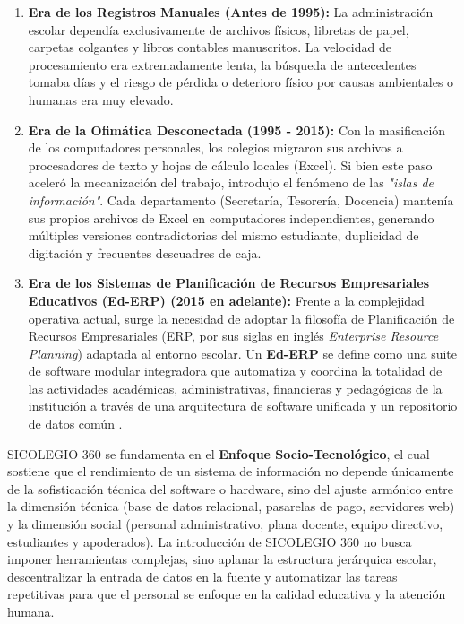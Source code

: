 \documentclass[12pt,a4paper,oneside]{report}
\begin{document}
    \begin{enumerate}
        \item \textbf{Era de los Registros Manuales (Antes de 1995):} La administración escolar dependía exclusivamente de archivos físicos, libretas de papel, carpetas colgantes y libros contables manuscritos. La velocidad de procesamiento era extremadamente lenta, la búsqueda de antecedentes tomaba días y el riesgo de pérdida o deterioro físico por causas ambientales o humanas era muy elevado.
        \item \textbf{Era de la Ofimática Desconectada (1995 - 2015):} Con la masificación de los computadores personales, los colegios migraron sus archivos a procesadores de texto y hojas de cálculo locales (Excel). Si bien este paso aceleró la mecanización del trabajo, introdujo el fenómeno de las \textit{"islas de información"}. Cada departamento (Secretaría, Tesorería, Docencia) mantenía sus propios archivos de Excel en computadores independientes, generando múltiples versiones contradictorias del mismo estudiante, duplicidad de digitación y frecuentes descuadres de caja.
        \item \textbf{Era de los Sistemas de Planificación de Recursos Empresariales Educativos (Ed-ERP) (2015 en adelante):} Frente a la complejidad operativa actual, surge la necesidad de adoptar la filosofía de Planificación de Recursos Empresariales (ERP, por sus siglas en inglés \textit{Enterprise Resource Planning}) adaptada al entorno escolar. Un \textbf{Ed-ERP} se define como una suite de software modular integradora que automatiza y coordina la totalidad de las actividades académicas, administrativas, financieras y pedagógicas de la institución a través de una arquitectura de software unificada y un repositorio de datos común \citep{laudon2016}.
    \end{enumerate}

    SICOLEGIO 360 se fundamenta en el \textbf{Enfoque Socio-Tecnológico}, el cual sostiene que el rendimiento de un sistema de información no depende únicamente de la sofisticación técnica del software o hardware, sino del ajuste armónico entre la dimensión técnica (base de datos relacional, pasarelas de pago, servidores web) y la dimensión social (personal administrativo, plana docente, equipo directivo, estudiantes y apoderados). La introducción de SICOLEGIO 360 no busca imponer herramientas complejas, sino aplanar la estructura jerárquica escolar, descentralizar la entrada de datos en la fuente y automatizar las tareas repetitivas para que el personal se enfoque en la calidad educativa y la atención humana.
\end{document}
